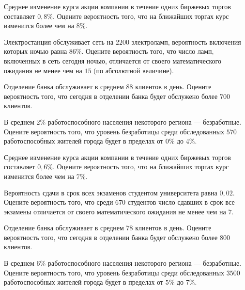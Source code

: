 \vfill

\newpage\setcounter{zad}{0}

\z Среднее изменение курса акции компании в течение одних биржевых торгов составляет $ 0{,}8 \% $. Оцените вероятность того, что на ближайших торгах курс изменится более чем на $ 8 \% $.


\vfill

\z Электростанция обслуживает сеть на $ 2200 $ электроламп, вероятность включения которых ночью равна $ 86 \% $. Оцените вероятность того, что число ламп, включенных в сеть сегодня ночью, отличается от своего математического ожидания не менее чем на $ 15 $ (по абсолютной величине). 
 

\vfill

\newpage\setcounter{zad}{0}

\z Отделение банка обслуживает в среднем $ 88 $ клиентов в день. Оцените вероятность того, что сегодня в отделении банка будет обслужено более $ 700 $ клиентов.


\vfill

\z В среднем $ 2 \% $ работоспособного населения некоторого региона --- безработные. Оцените вероятность того, что уровень безработицы среди обследованных $ 570 $ работоспособных жителей города будет в пределах от $ 0 \%$ до $ 4 \%$.
 

\vfill

\newpage\setcounter{zad}{0}

\z Среднее изменение курса акции компании в течение одних биржевых торгов составляет $ 0{,}6 \% $. Оцените вероятность того, что на ближайших торгах курс изменится более чем на $ 7 \% $.


\vfill

\z Вероятность сдачи в срок всех экзаменов студентом университета равна $ 0{,}02 $. Оцените вероятность того, что среди $ 670 $ студентов число сдавших в срок все экзамены отличается от своего математического ожидания не менее чем на $ 7 $. 
 

\vfill

\newpage\setcounter{zad}{0}

\z Отделение банка обслуживает в среднем $ 78 $ клиентов в день. Оцените вероятность того, что сегодня в отделении банка будет обслужено более $ 800 $ клиентов.


\vfill

\z В среднем $ 6 \% $ работоспособного населения некоторого региона --- безработные. Оцените вероятность того, что уровень безработицы среди обследованных $ 3500 $ работоспособных жителей города будет в пределах от $ 5 \%$ до $ 7 \%$.
 

